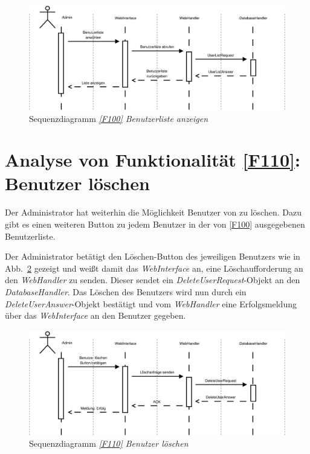 \begin{figure}[h]
\centering
\includegraphics[width=1\textwidth]{Systementwurf/02_produktfunktionsanalyse/f1000}
\caption{Sequenzdiagramm \textit{\ref{F100} Benutzerliste anzeigen}
\label{sd100}}
\end{figure}

\FloatBarrier

\section{Analyse von Funktionalität \ref{F110}: Benutzer löschen}

Der Administrator hat weiterhin die Möglichkeit Benutzer von \NewsGenie
zu löschen. Dazu gibt es einen weiteren Button zu jedem Benutzer in der von
\ref{F100} ausgegebenen Benutzerliste.

Der Administrator betätigt den Löschen-Button des jeweiligen Benutzers wie in
Abb.~\ref{sd110} gezeigt und weißt damit das \textit{WebInterface} an, eine
Löschaufforderung an den \textit{WebHandler} zu senden. Dieser sendet ein
\textit{DeleteUserRequest}-Objekt an den \textit{DatabaseHandler}. Das Löschen
des Benutzers wird nun durch ein \textit{DeleteUserAnswer}-Objekt bestätigt und
vom \textit{WebHandler} eine Erfolgsmeldung über das \textit{WebInterface} an
den Benutzer gegeben.

\begin{figure}[h]
\centering
\includegraphics[width=1\textwidth]{Systementwurf/02_produktfunktionsanalyse/f1100}
\caption{Sequenzdiagramm \textit{\ref{F110} Benutzer löschen}
\label{sd110}}
\end{figure}


